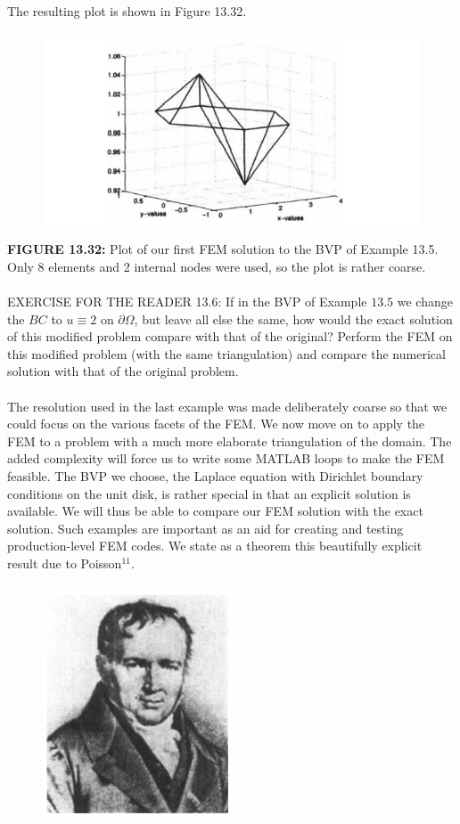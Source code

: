 \documentclass[../main.tex]{subfiles}
\begin{document}
\\
\\
The resulting plot is shown in Figure 13.32. 
\begin{figure}[H]
\includegraphics[width=1\linewidth]{17}
	\centering
	\label{pfig:ch13_17}
\end{figure}
\textbf{FIGURE 13.32:} Plot of our first FEM solution to the BVP of Example 13.5. Only 8 
elements and 2 internal nodes were used, so the plot is rather coarse. 
\\
\\
EXERCISE FOR THE READER 13.6: If in the BVP of Example $13.5$ we change the $B C$ to $u \equiv 2$ on $\partial \Omega$, but leave all else the same, how would the exact solution of this modified problem compare with that of the original? Perform the FEM on this modified problem (with the same triangulation) and compare the numerical solution with that of the original problem.
\\
\\
The resolution used in the last example was made deliberately coarse so that we could focus on the various facets of the FEM. We now move on to apply the FEM to a problem with a much more elaborate triangulation of the domain. The added complexity will force us to write some MATLAB loops to make the FEM feasible. The BVP we choose, the Laplace equation with Dirichlet boundary conditions on the unit disk, is rather special in that an explicit solution is available. We will thus be able to compare our FEM solution with the exact solution. Such examples are important as an aid for creating and testing production-level FEM codes. We state as a theorem this beautifully explicit result due to Poisson$^{11}$.
\begin{figure}[H]
\includegraphics[width=0.35\linewidth]{18}
	\centering
	\label{pfig:ch13_17}
\end{figure}
\end{document}
